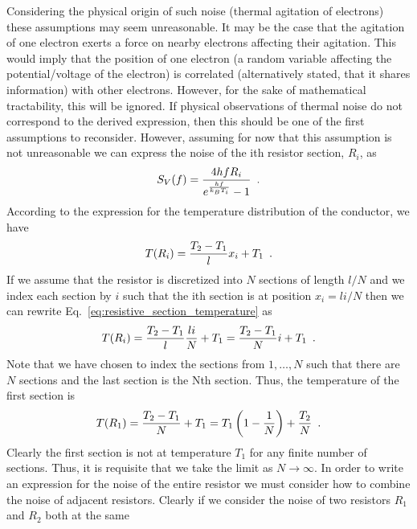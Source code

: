 \documentclass{article}
\begin{document}
Considering the physical origin of such noise (thermal agitation of electrons)
these assumptions may seem unreasonable. It may be the case that the agitation
of one electron exerts a force on nearby electrons affecting their agitation.
This would imply that the position of one electron (a random variable affecting
the potential/voltage of the electron) is correlated (alternatively stated, that
it shares information) with other electrons. However, for the sake of
mathematical tractability, this will be ignored. If physical observations of
thermal noise do not correspond to the derived expression, then this should be
one of the first assumptions to reconsider. However, assuming for now that this
assumption is not unreasonable we can express the noise of the ith resistor
section, $ R_{i} $, as
\begin{equation}
   S_{V}(f) = \frac{4 h f R_{i}}{e^{\frac{hf}{k_{B}T_{i}}}-1} \enskip.
   \label{eq:nyqist_noise_expression_discretized}
\end{equation}
According to the expression for the temperature distribution of the conductor,
we have
\begin{equation}
T(R_{i}) = \frac{T_{2}-T_{1}}{l}x_{i} +T_{1} \enskip.
\label{eq:resistive_section_temperature}
\end{equation}
If we assume that the resistor is discretized into $ N $ sections of length $
l/N $ and we index each section by $ i $ such that the ith section is at position
$ x_{i} = li/N $ then we can rewrite Eq.~\ref{eq:resistive_section_temperature}
as
\begin{equation}
T(R_{i}) = \frac{T_{2}-T_{1}}{l}\frac{li}{N} +T_{1} =  \frac{T_{2}-T_{1}}{N}i +T_{1}\enskip.
\label{eq:resistance_of_ith_resistive_section}
\end{equation}
Note that we have chosen to index the sections from $ 1,\ldots,N $ such that
there are $ N $ sections and the last section is the Nth section. Thus, the
temperature of the first section is
\begin{equation}
   T(R_{1}) = \frac{T_{2}- T_{1}}{N} + T_{1} = T_{1} \left( 1 - \frac{1}{N} \right)
   + \frac{T_{2}}{N} \enskip.
\end{equation}
Clearly the first section is not at temperature $ T_{1} $ for any finite number
of sections. Thus, it is requisite that we take the limit as $ N \rightarrow
\infty $. In order to write an expression for the noise of the entire resistor
we must consider how to combine the noise of adjacent resistors. Clearly if we
consider the noise of two resistors $ R_{1} $ and $ R_{2} $ both at the same
\end{document}
